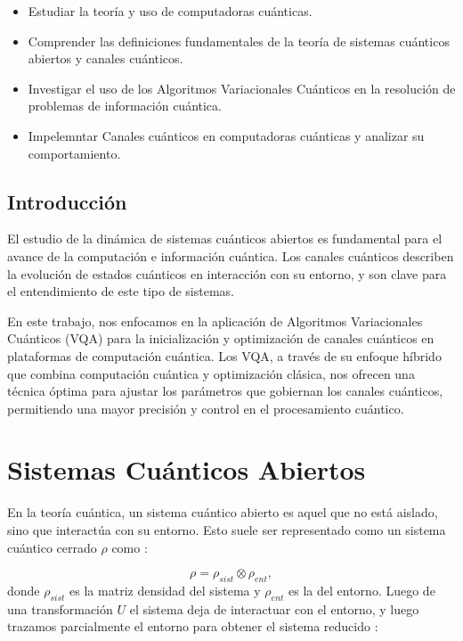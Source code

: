 \documentclass[11pt, spanish, letterpage]{report} %
\newcommand{\1}{\mathbb{1}}
\newcounter{problem}[section]
\begin{document}
\begin{itemize}
\item Estudiar la teoría y uso de computadoras cuánticas.


    \item Comprender las definiciones fundamentales de la teoría de sistemas cuánticos abiertos y canales cuánticos.
    
    \item Investigar el uso de los Algoritmos Variacionales Cuánticos en la resolución de problemas de información cuántica.

    \item Impelemntar Canales cuánticos en computadoras cuánticas y analizar su comportamiento.
\end{itemize}


\section{Introducción}

El estudio de la dinámica de sistemas cuánticos abiertos es fundamental para el avance de la computación e información cuántica. Los canales cuánticos describen la evolución de estados cuánticos en  interacción con su entorno, y son clave para el entendimiento de este tipo de sistemas.

En este trabajo, nos enfocamos en la aplicación de Algoritmos Variacionales Cuánticos (VQA) para la inicialización y optimización de canales cuánticos en plataformas de computación cuántica. Los VQA, a través de su enfoque híbrido que combina computación cuántica y optimización clásica, nos ofrecen una técnica óptima para ajustar los parámetros que gobiernan los canales cuánticos, permitiendo una mayor precisión y control en el procesamiento cuántico.


\chapter{Sistemas Cuánticos Abiertos} \label{ch:1} 

En la teoría cuántica, un sistema cuántico abierto es aquel que no está aislado, sino que interactúa con su entorno. Esto suele ser representado como un sistema cuántico cerrado $\rho$ como \cite{nielsen_chuang_2011}:

\begin{equation}
    \rho = \rho_{sist} \otimes \rho_{ent},
\end{equation}
donde $\rho_{sist}$ es la matriz densidad del sistema y $\rho_{ent}$ es la del entorno. Luego de una transformación $U$ el sistema deja de interactuar con el entorno, y luego trazamos parcialmente el entorno para obtener el sistema reducido  : 
\end{document}
